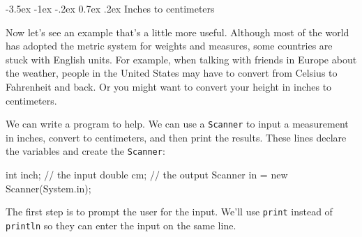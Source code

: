 \documentclass[12pt]{book}
\makeatletter
\theoremstyle{exercise}
\newcommand{\java}[1]{\verb"#1"}
\renewcommand{\section}{\@startsection{section}{1}{\z@}%
    {-3.5ex \@plus -1ex \@minus -.2ex}%
    {0.7ex \@plus.2ex}%
    {\normalfont\Large\bfseries}}
\newcommand{\java}[1]{\lstinline{#1}} %
\makeatother
\begin{document}


\section{Inches to centimeters}

Now let's see an example that's a little more useful.
Although most of the world has adopted the metric system for weights and measures, some countries are stuck with English units.
For example, when talking with friends in Europe about the weather, people in the United States may have to convert from Celsius to Fahrenheit and back.
Or you might want to convert your height in inches to centimeters.


We can write a program to help.
We can use a \java{Scanner} to input a measurement in inches, convert to centimeters, and then print the results.
These lines declare the variables and create the \java{Scanner}:



\begin{code}
    int inch;  // the input
    double cm;  // the output
    Scanner in = new Scanner(System.in);
\end{code}

The first step is to prompt the user for the input.
We'll use \java{print} instead of \java{println} so they can enter the input on the same line.
\end{document}
